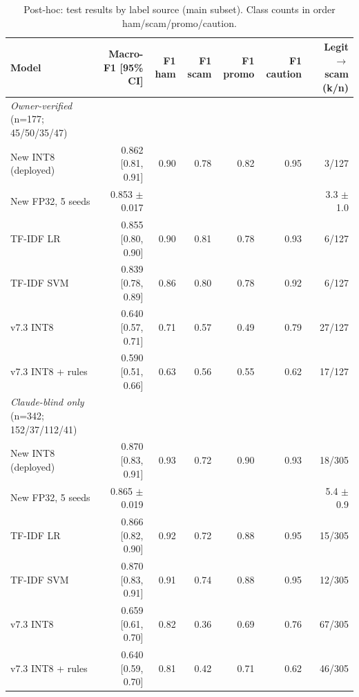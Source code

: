 \begin{table}[t]
\centering
\caption{Post-hoc: test results by label source (main subset). Class counts in order ham/scam/promo/caution.}
\label{tab:ph_labelsource}
\small
\begin{tabular}{lrrrrrr}
\toprule
Model & Macro-F1 [95\% CI] & F1 ham & F1 scam & F1 promo & F1 caution & Legit$\to$scam (k/n) \\
\midrule
\textit{Owner-verified} (n=177; 45/50/35/47) &  &  &  &  &  &  \\
New INT8 (deployed) & 0.862 [0.81, 0.91] & 0.90 & 0.78 & 0.82 & 0.95 & 3/127 \\
New FP32, 5 seeds & 0.853 $\pm$ 0.017 &  &  &  &  & 3.3 $\pm$ 1.0 \\
TF-IDF LR & 0.855 [0.80, 0.90] & 0.90 & 0.81 & 0.78 & 0.93 & 6/127 \\
TF-IDF SVM & 0.839 [0.78, 0.89] & 0.86 & 0.80 & 0.78 & 0.92 & 6/127 \\
v7.3 INT8 & 0.640 [0.57, 0.71] & 0.71 & 0.57 & 0.49 & 0.79 & 27/127 \\
v7.3 INT8 + rules & 0.590 [0.51, 0.66] & 0.63 & 0.56 & 0.55 & 0.62 & 17/127 \\
\textit{Claude-blind only} (n=342; 152/37/112/41) &  &  &  &  &  &  \\
New INT8 (deployed) & 0.870 [0.83, 0.91] & 0.93 & 0.72 & 0.90 & 0.93 & 18/305 \\
New FP32, 5 seeds & 0.865 $\pm$ 0.019 &  &  &  &  & 5.4 $\pm$ 0.9 \\
TF-IDF LR & 0.866 [0.82, 0.90] & 0.92 & 0.72 & 0.88 & 0.95 & 15/305 \\
TF-IDF SVM & 0.870 [0.83, 0.91] & 0.91 & 0.74 & 0.88 & 0.95 & 12/305 \\
v7.3 INT8 & 0.659 [0.61, 0.70] & 0.82 & 0.36 & 0.69 & 0.76 & 67/305 \\
v7.3 INT8 + rules & 0.640 [0.59, 0.70] & 0.81 & 0.42 & 0.71 & 0.62 & 46/305 \\
\bottomrule
\end{tabular}
\end{table}
